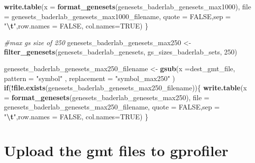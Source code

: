 \documentclass[
]{book}
\newenvironment{Shaded}{\begin{snugshade}}{\end{snugshade}}
\newcommand{\AttributeTok}[1]{\textcolor[rgb]{0.13,0.29,0.53}{#1}}
\newcommand{\CommentTok}[1]{\textcolor[rgb]{0.56,0.35,0.01}{\textit{#1}}}
\newcommand{\ConstantTok}[1]{\textcolor[rgb]{0.56,0.35,0.01}{#1}}
\newcommand{\ControlFlowTok}[1]{\textcolor[rgb]{0.13,0.29,0.53}{\textbf{#1}}}
\newcommand{\DecValTok}[1]{\textcolor[rgb]{0.00,0.00,0.81}{#1}}
\newcommand{\FunctionTok}[1]{\textcolor[rgb]{0.13,0.29,0.53}{\textbf{#1}}}
\newcommand{\NormalTok}[1]{#1}
\newcommand{\OtherTok}[1]{\textcolor[rgb]{0.56,0.35,0.01}{#1}}
\newcommand{\SpecialCharTok}[1]{\textcolor[rgb]{0.81,0.36,0.00}{\textbf{#1}}}
\newcommand{\StringTok}[1]{\textcolor[rgb]{0.31,0.60,0.02}{#1}}
\begin{document}
\begin{Shaded}
\begin{Highlighting}[]
  \FunctionTok{write.table}\NormalTok{(}\AttributeTok{x =} \FunctionTok{format\_genesets}\NormalTok{(genesets\_baderlab\_genesets\_max1000),}
            \AttributeTok{file =}\NormalTok{ genesets\_baderlab\_genesets\_max1000\_filename,}
            \AttributeTok{quote =} \ConstantTok{FALSE}\NormalTok{,}\AttributeTok{sep =} \StringTok{"}\SpecialCharTok{\textbackslash{}t}\StringTok{"}\NormalTok{,}\AttributeTok{row.names =} \ConstantTok{FALSE}\NormalTok{,}
            \AttributeTok{col.names=}\ConstantTok{TRUE}\NormalTok{)}
\NormalTok{\}}

\CommentTok{\#max gs size of 250}
\NormalTok{genesets\_baderlab\_genesets\_max250 }\OtherTok{\textless{}{-}} \FunctionTok{filter\_genesets}\NormalTok{(genesets\_baderlab\_genesets,}
\NormalTok{                                                      gs\_sizes\_baderlab\_sets, }
                                                      \DecValTok{250}\NormalTok{)}


\NormalTok{genesets\_baderlab\_genesets\_max250\_filename }\OtherTok{\textless{}{-}} \FunctionTok{gsub}\NormalTok{(}\AttributeTok{x =}\NormalTok{dest\_gmt\_file, }
                                                  \AttributeTok{pattern =} \StringTok{"symbol"}\NormalTok{ ,}
                                                  \AttributeTok{replacement =} \StringTok{"symbol\_max250"}
\NormalTok{                                                     )}
\ControlFlowTok{if}\NormalTok{(}\SpecialCharTok{!}\FunctionTok{file.exists}\NormalTok{(genesets\_baderlab\_genesets\_max250\_filename))\{}
  \FunctionTok{write.table}\NormalTok{(}\AttributeTok{x =} \FunctionTok{format\_genesets}\NormalTok{(genesets\_baderlab\_genesets\_max250),}
            \AttributeTok{file =}\NormalTok{ genesets\_baderlab\_genesets\_max250\_filename,}
            \AttributeTok{quote =} \ConstantTok{FALSE}\NormalTok{,}\AttributeTok{sep =} \StringTok{"}\SpecialCharTok{\textbackslash{}t}\StringTok{"}\NormalTok{,}\AttributeTok{row.names =} \ConstantTok{FALSE}\NormalTok{,}
            \AttributeTok{col.names=}\ConstantTok{TRUE}\NormalTok{)}
\NormalTok{\}}
\end{Highlighting}
\end{Shaded}

\hypertarget{upload-the-gmt-files-to-gprofiler}{%
\section{Upload the gmt files to gprofiler}\label{upload-the-gmt-files-to-gprofiler}}
\end{document}
